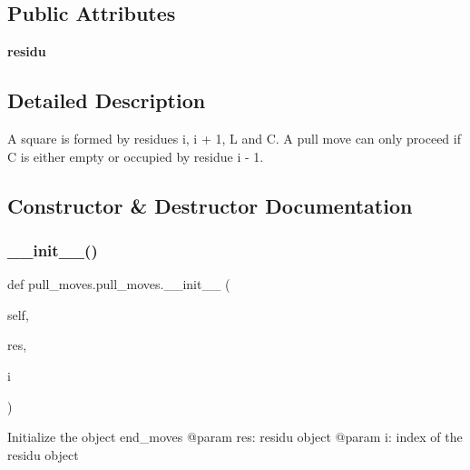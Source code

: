 \subsection*{Public Attributes}
\begin{DoxyCompactItemize}
\item 
\mbox{\label{classpull__moves_1_1pull__moves_a09866746bd2414da818ba8eedb1963ac}} 
{\bfseries residu}
\end{DoxyCompactItemize}


\subsection{Detailed Description}
\begin{DoxyVerb}A square is formed by residues i, i + 1, L and C.
A pull move can only proceed if C is either empty or occupied by
residue i - 1.
\end{DoxyVerb}
 

\subsection{Constructor \& Destructor Documentation}
\mbox{\label{classpull__moves_1_1pull__moves_a0877c3a2c3818eecdf3622ea01acf714}} 
\subsubsection{\texorpdfstring{\+\_\+\+\_\+init\+\_\+\+\_\+()}{\_\_init\_\_()}}
{\footnotesize\ttfamily def pull\+\_\+moves.\+pull\+\_\+moves.\+\_\+\+\_\+init\+\_\+\+\_\+ (\begin{DoxyParamCaption}\item[{}]{self,  }\item[{}]{res,  }\item[{}]{i }\end{DoxyParamCaption})}

\begin{DoxyVerb}Initialize the object end_moves
    @param res: residu object
    @param   i: index of the residu object
\end{DoxyVerb}
 

